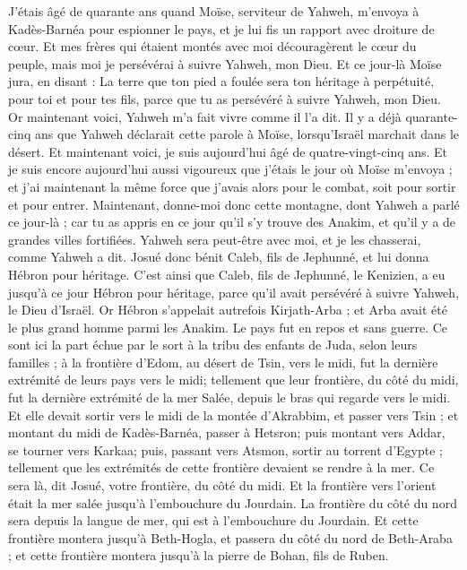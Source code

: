 \begin{multicols}{2}
J'étais âgé de quarante ans quand Moïse, serviteur de Yahweh, m'envoya à Kadès-Barnéa pour espionner le pays, et je lui fis un rapport avec droiture de cœur.
Et mes frères qui étaient montés avec moi découragèrent le cœur du peuple, mais moi je persévérai à suivre Yahweh, mon Dieu.
Et ce jour-là Moïse jura, en disant : La terre que ton pied a foulée sera ton héritage à perpétuité, pour toi et pour tes fils, parce que tu as persévéré à suivre Yahweh, mon Dieu.
Or maintenant voici, Yahweh m'a fait vivre comme il l'a dit. Il y a déjà quarante-cinq ans que Yahweh déclarait cette parole à Moïse, lorsqu'Israël marchait dans le désert. Et maintenant voici, je suis aujourd'hui âgé de quatre-vingt-cinq ans.
Et je suis encore aujourd'hui aussi vigoureux que j'étais le jour où Moïse m'envoya ; et j'ai maintenant la même force que j'avais alors pour le combat, soit pour sortir et pour entrer.
Maintenant, donne-moi donc cette montagne, dont Yahweh a parlé ce jour-là ; car tu as appris en ce jour qu'il s'y trouve des Anakim, et qu'il y a de grandes villes fortifiées. Yahweh sera peut-être avec moi, et je les chasserai, comme Yahweh a dit.
Josué donc bénit Caleb, fils de Jephunné, et lui donna Hébron pour héritage.
C'est ainsi que Caleb, fils de Jephunné, le Kenizien, a eu jusqu'à ce jour Hébron pour héritage, parce qu'il avait persévéré à suivre Yahweh, le Dieu d'Israël.
Or Hébron s'appelait autrefois Kirjath-Arba ; et Arba avait été le plus grand homme parmi les Anakim. Le pays fut en repos et sans guerre.
\VerseOne{} Ce sont ici la part échue par le sort à la tribu des enfants de Juda, selon leurs familles ; à la frontière d'Edom, au désert de Tsin, vers le midi, fut la dernière extrémité de leurs pays vers le midi;
tellement que leur frontière, du côté du midi, fut la dernière extrémité de la mer Salée, depuis le bras qui regarde vers le midi. 
Et elle devait sortir vers le midi de la montée d'Akrabbim, et passer vers Tsin ; et montant du midi de Kadès-Barnéa, passer à Hetsron; puis montant vers Addar, se tourner vers Karkaa; 
puis, passant vers Atsmon, sortir au torrent d'Egypte ; tellement que les extrémités de cette frontière devaient se rendre à la mer. Ce sera là, dit Josué, votre frontière, du côté du midi.
Et la frontière vers l'orient était la mer salée jusqu'à l'embouchure du Jourdain. La frontière du côté du nord sera depuis la langue de mer, qui est à l'embouchure du Jourdain.
Et cette frontière montera jusqu'à Beth-Hogla, et passera du côté du nord de Beth-Araba ; et cette frontière montera jusqu'à la pierre de Bohan, fils de Ruben.

\end{multicols}
